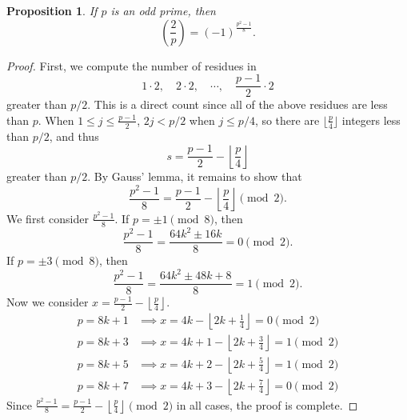 \documentclass{amsbook}
\numberwithin{section}{chapter}
\theoremstyle{plain}
\newtheorem{prop}[thm]{Proposition}
\theoremstyle{definition}
\begin{document}
\begin{prop}
If $p$ is an odd prime, then
\[\left(\frac{2}{p}\right) = (-1)^\frac{p^2 - 1}{8}.\]
\end{prop}
\begin{proof}
First, we compute the number of residues in
\[1\cdot 2,\quad 2\cdot 2,\quad\cdots,\quad \frac{p-1}{2}\cdot 2\]
greater than $p/2$. This is a direct count since all of the
above residues are less than $p$. When $1\le j\le\frac{p-1}{2}$,
$2j < p/2$ when $j\le p/4$, so there are $\lfloor\frac{p}{4}\rfloor$
integers less than $p/2$, and thus
\[s = \frac{p-1}{2} - \left\lfloor\frac{p}{4}\right\rfloor\]
greater than $p/2$.
By Gauss' lemma, it remains to show that
\[\frac{p^2 - 1}{8} = \frac{p-1}{2}
- \left\lfloor\frac{p}{4}\right\rfloor\pmod 2.\]
We first consider $\frac{p^2 - 1}{8}$. If $p = \pm 1\pmod 8$,
then
\[\frac{p^2 - 1}{8} = \frac{64k^2\pm 16k}{8} = 0\pmod 2.\]
If $p = \pm 3\pmod 8$, then
\[\frac{p^2 - 1}{8} =\frac{64k^2\pm 48k + 8}{8} =  1\pmod 2.\]
Now we consider
$x = \frac{p-1}{2} - \left\lfloor\frac{p}{4}\right\rfloor$.
\begin{align*}
p = 8k + 1 &\implies x = 4k -
\left\lfloor 2k + \frac{1}{4}\right\rfloor = 0\pmod 2\\[1em]
p = 8k + 3 &\implies x = 4k + 1 -
\left\lfloor 2k + \frac{3}{4}\right\rfloor = 1\pmod 2\\[1em]
p = 8k + 5 &\implies x = 4k + 2 -
\left\lfloor 2k + \frac{5}{4}\right\rfloor = 1\pmod 2\\[1em]
p = 8k + 7 &\implies x = 4k + 3 -
\left\lfloor 2k + \frac{7}{4}\right\rfloor = 0\pmod 2
\end{align*}
Since $\frac{p^2 - 1}{8} = \frac{p-1}{2}
- \left\lfloor\frac{p}{4}\right\rfloor\pmod 2$
in all cases, the proof is complete.
\end{proof}
\end{document}
